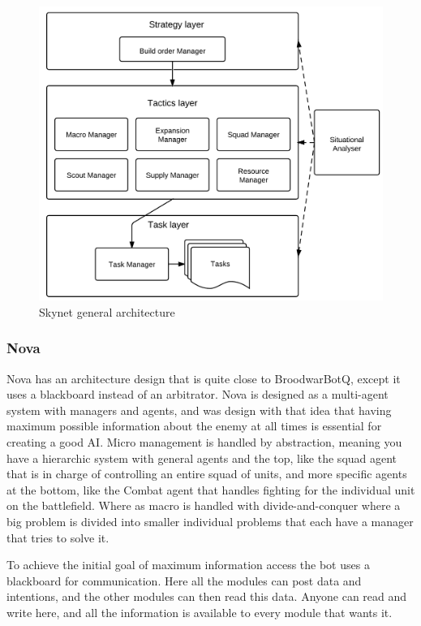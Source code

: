 
\begin{figure}[h!tbp]
\centering
\includegraphics[scale=0.8]{graphics/skynet.png}
\caption{Skynet general architecture}
\label{fig:skynetarch}
\end{figure}

\subsubsection{Nova}
Nova\cite{pérezmulti} has an architecture design that is quite close to BroodwarBotQ, except it uses a blackboard instead of an arbitrator. Nova is designed as a multi-agent system with managers and agents, and was design with that idea that having maximum possible information about the enemy at all times is essential for creating a good AI. Micro management is handled by abstraction, meaning you have a hierarchic system with general agents and the top, like the squad agent that is in charge of controlling an entire squad of units, and more specific agents at the bottom, like the Combat agent that handles fighting for the individual unit on the battlefield. Where as macro is handled with divide-and-conquer where a big problem is divided into smaller individual problems that each have a manager that tries to solve it. 

To achieve the initial goal of maximum information access the bot uses a blackboard for communication. Here all the modules can post data and intentions, and the other modules can then read this data. Anyone can read and write here, and all the information is available to every module that wants it. 

